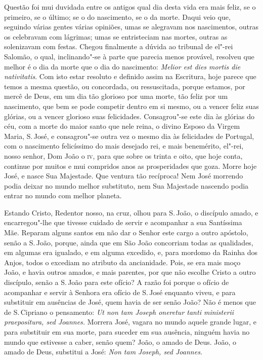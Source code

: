 \noindent{}Questão foi mui duvidada entre os antigos qual dia desta vida era mais
feliz, se o primeiro, se o último; se o do nascimento, se o da morte.
Daqui veio que, seguindo várias gentes várias opiniões, umas se
alegravam nos nascimentos, outras os celebravam com lágrimas; umas se
entristeciam nas mortes, outras as solenizavam com festas. Chegou
finalmente a dúvida ao tribunal de el"-rei Salomão, o qual, inclinando"-se
à parte que parecia menos provável, resolveu que melhor é o dia da morte
que o dia do nascimento: \emph{Melior est dies mortis die nativitatis}.
Com isto estar resoluto e definido assim na Escritura,
hoje parece que temos a mesma questão, ou concordada, ou ressuscitada,
porque estamos, por mercê de Deus, em um dia tão glorioso por uma morte,
tão feliz por um nascimento, que bem se pode competir dentro em si
mesmo, ou a vencer feliz suas glórias, ou a vencer glorioso suas
felicidades. Consagrou"-se este dia às glórias do céu, com a morte do
maior santo que nele reina, o divino Esposo da Virgem Maria, S.\,José, e
consagrou"-se outra vez o mesmo dia às felicidades de Portugal, com o
nascimento felicíssimo do mais desejado rei, e mais benemérito, el"-rei,
nosso senhor, Dom João o \textsc{iv}, para que sobre os trinta e oito, que hoje
conta, continue por muitos e mui compridos anos as prosperidades que
goza. Morre hoje José, e nasce Sua Majestade. Que ventura tão recíproca!
Nem José morrendo podia deixar no mundo melhor substituto, nem Sua
Majestade nascendo podia entrar no mundo com melhor planeta.

Estando Cristo, Redentor nosso, na cruz, olhou para S.\,João, o discípulo
amado, e encarregou"-lhe que tivesse cuidado de servir e acompanhar a sua
Santíssima Mãe. Reparam alguns santos em não dar o Senhor este cargo a
outro apóstolo, senão a S.\,João, porque, ainda que em São João
concorriam todas as qualidades, em algumas era igualado, e em alguma
excedido, e, para mordomo da Rainha dos Anjos, todos o excediam no
atributo da ancianidade. Pois, se era mais moço João, e havia outros
amados, e mais parentes, por
que não escolhe Cristo a outro discípulo, senão a S.\,João para este
ofício? A razão foi porque o ofício de acompanhar e servir à Senhora era
ofício de S.\,José enquanto viveu, e para substituir em ausências de
José, quem havia de ser senão João? Não é menos que de S.\,Cipriano o
pensamento: \emph{Ut non tam Joseph oneretur tanti ministerii
praepositura, sed Joannes.} Morrera José, vagara no mundo aquele
grande lugar, e para substituir em sua morte, para suceder em sua
ausência, ninguém havia no mundo que estivesse a caber, senão quem?
João, o amado de Deus. João, o amado de Deus, substitui a José:
\emph{Non tam Joseph, sed Joannes.}

